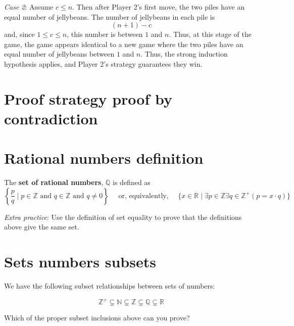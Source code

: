 \documentclass[12pt, oneside]{article}
\begin{document}
{\it Case 2}: Assume $c \leq n$. Then after Player 2's first move,
the two piles have an equal number of jellybeans. The number
of jellybeans in each pile is 
\[
    (n+1) - c
\]
and, since $1 \leq c \leq n$, this number is between $1$ and $n$.
Thus, at this stage of the game, the game appears identical to a new 
game where the two piles have an equal number of jellybeans between $1$
and $n$. Thus, the strong induction hypothesis applies, and Player 2's
strategy guarantees they win.

 \vfill
\section*{Proof strategy proof by contradiction}



 \vfill
\section*{Rational numbers definition}


The {\bf set  of rational numbers}, $\mathbb{Q}$  is defined as 
\[
\left\{ \frac{p}{q} \mid p \in \mathbb{Z}  \text{ and  } q  \in \mathbb{Z} \text{ and } q \neq  0 \right\}
\text{~~~~or, equivalently,~~~~}
\{ x  \in  \mathbb{R} \mid \exists p \in \mathbb{Z}  \exists q \in \mathbb{Z}^+ ( p =  x \cdot q) \}
\]

{\it Extra practice}: Use the definition of set equality to prove that the definitions above  give the same set.

 \vfill
\section*{Sets numbers subsets}


We have the following subset relationships between sets of numbers:

\[
    \mathbb{Z}^{+} \subsetneq \mathbb{N} \subsetneq \mathbb{Z} \subsetneq \mathbb{Q} \subsetneq \mathbb{R}
\]


Which of the proper subset inclusions above can you prove?
\end{document}
